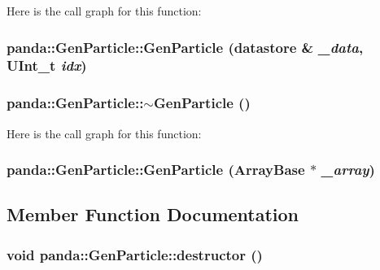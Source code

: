 Here is the call graph for this function:\hypertarget{classpanda_1_1GenParticle_a3f40ef5315a59c8f6fe86275c16c73fb}{
\subsubsection[{GenParticle}]{\setlength{\rightskip}{0pt plus 5cm}panda::GenParticle::GenParticle ({\bf datastore} \& {\em \_\-data}, \/  UInt\_\-t {\em idx})}}
\label{classpanda_1_1GenParticle_a3f40ef5315a59c8f6fe86275c16c73fb}
\hypertarget{classpanda_1_1GenParticle_a777f200cb71277187c952281a4994e76}{
\subsubsection[{$\sim$GenParticle}]{\setlength{\rightskip}{0pt plus 5cm}panda::GenParticle::$\sim$GenParticle ()}}
\label{classpanda_1_1GenParticle_a777f200cb71277187c952281a4994e76}


Here is the call graph for this function:\hypertarget{classpanda_1_1GenParticle_ab10d7da92ebc75ab1fadc9c6f282c1ed}{
\subsubsection[{GenParticle}]{\setlength{\rightskip}{0pt plus 5cm}panda::GenParticle::GenParticle ({\bf ArrayBase} $\ast$ {\em \_\-array})}}
\label{classpanda_1_1GenParticle_ab10d7da92ebc75ab1fadc9c6f282c1ed}


\subsection{Member Function Documentation}
\hypertarget{classpanda_1_1GenParticle_a3741159cb9918fc4a7bf714995d72469}{
\subsubsection[{destructor}]{\setlength{\rightskip}{0pt plus 5cm}void panda::GenParticle::destructor ()}}
\label{classpanda_1_1GenParticle_a3741159cb9918fc4a7bf714995d72469}


